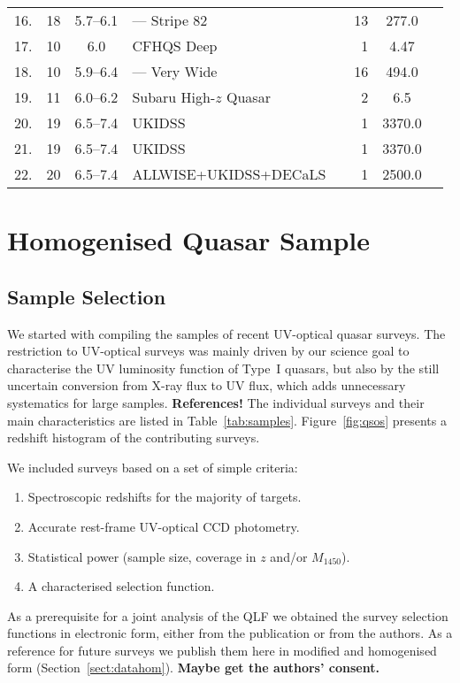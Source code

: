 \documentclass[a4paper,fleqn,usenatbib]{mnras}
\begin{document}
\begin{table*}
\begin{tabular}{crcllrSl}
    16. & 18 & 5.7--6.1 & --- Stripe 82 & \citet{2016ApJ...833..222J} & 13 & 277.0 & \\
    17. & 10 & 6.0 & CFHQS Deep & \citet{2010AJ....139..906W} & 1 & 4.47 & \\
    18. & 10 & 5.9--6.4 & --- Very Wide & \citet{2010AJ....139..906W} & 16 & 494.0 & \\
    19. & 11 & 6.0--6.2 & Subaru High-$z$ Quasar & \citet{2015ApJ...798...28K} & 2 & 6.5 & \\
    20. & 19 & 6.5--7.4 & UKIDSS & \citet{2011Natur.474..616M} & 1 & 3370.0 & \\
    21. & 19 & 6.5--7.4 & UKIDSS & \citet{2007MNRAS.376L..76V} & 1 & 3370.0 & \\
    22. & 20 & 6.5--7.4 & ALLWISE+UKIDSS+DECaLS & \citet{2018Natur.553..473B} & 1 & 2500.0 & \\
    \hline
  \end{tabular}
\end{table*}

\section{Homogenised Quasar Sample}
\label{sec:sample}

\subsection{Sample Selection}

We started with compiling the samples of recent UV-optical quasar
surveys. The restriction to UV-optical surveys was mainly driven by
our science goal to characterise the UV luminosity function of Type~I
quasars, but also by the still uncertain conversion from X-ray flux to
UV flux, which adds unnecessary systematics for large
samples. \textbf{References!} The individual surveys and their main
characteristics are listed in
Table~\ref{tab:samples}. Figure~\ref{fig:qsos} presents a redshift
histogram of the contributing surveys.

We included surveys based on a set of simple criteria:
\begin{enumerate}
\item Spectroscopic redshifts for the majority of targets.
\item Accurate rest-frame UV-optical CCD photometry.
\item Statistical power (sample size, coverage in $z$ and/or $M_{1450}$).
\item A characterised selection function.
\end{enumerate}
As a prerequisite for a joint analysis of the QLF we obtained the
survey selection functions in electronic form, either from the
publication or from the authors. As a reference for future surveys we
publish them here in modified and homogenised form
(Section~\ref{sect:datahom}). \textbf{Maybe get the authors' consent.}
\end{document}
